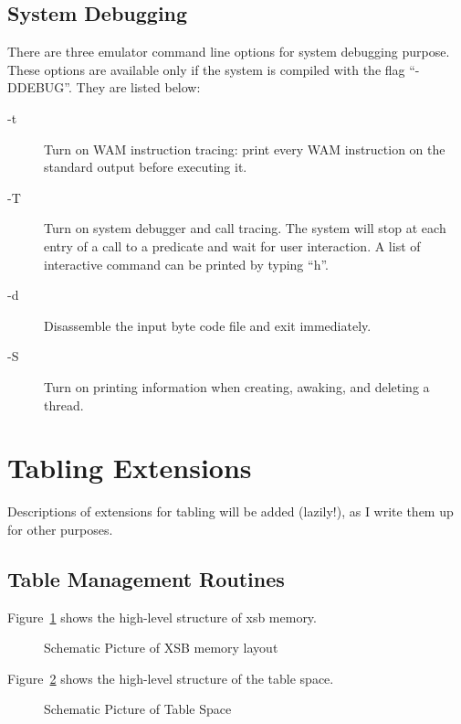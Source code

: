 \documentclass[11pt]{article}
\begin{document}
\subsection{System Debugging}

There are three emulator command line options for system debugging purpose.
These options are available only if the system is compiled with the flag
``-DDEBUG''.  They are listed below:

\begin{description}
  \item[-t] Turn on WAM instruction tracing: print every WAM instruction
	on the standard output before executing it.
  \item[-T] Turn on system debugger and call tracing. The system will stop
	at each entry of a call to a predicate and wait for user interaction.
	A list of interactive command can be printed by typing ``h''.
  \item[-d] Disassemble the input byte code file and exit immediately.
  \item[-S] Turn on printing information when creating, awaking, and deleting
	a thread.
\end{description} 



\section{Tabling Extensions} \label{sec:tabling}

Descriptions of extensions for tabling will be added (lazily!), as I
write them up for other purposes.

\subsection{Table Management Routines}

Figure~\ref{stack-layout.ps} shows the high-level structure of xsb memory.

\begin{figure}[htbp]
\caption{Schematic Picture of XSB memory layout}\label{stack-layout.ps}
\end{figure}

Figure~\ref{tabspc.ps} shows the high-level structure of the table
space.  

\begin{figure}[htbp]
\caption{Schematic Picture of Table Space}\label{tabspc.ps}
\end{figure}
\end{document}
